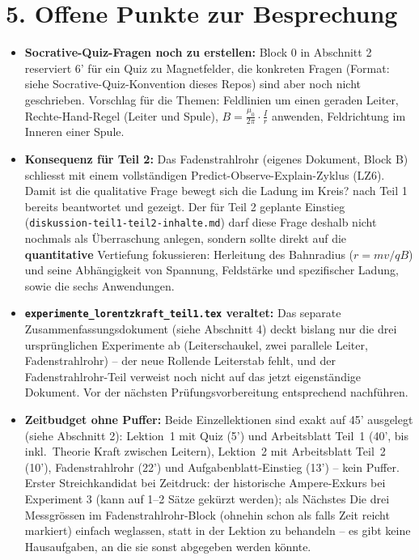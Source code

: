 \documentclass[11pt,a4paper]{article}
\begin{document}
\section*{5. Offene Punkte zur Besprechung}

\begin{itemize}[leftmargin=1.2cm,itemsep=0.4em]
  \item \textcolor{warnred}{\textbf{Socrative-Quiz-Fragen noch zu
  erstellen:}} Block 0 in Abschnitt 2 reserviert 6' für ein Quiz zu
  Magnetfelder, die konkreten Fragen (Format: siehe
  Socrative-Quiz-Konvention dieses Repos) sind aber noch nicht
  geschrieben. Vorschlag für die Themen: Feldlinien um einen geraden
  Leiter, Rechte-Hand-Regel (Leiter und Spule),
  $B=\frac{\mu_0}{2\pi}\cdot\frac{I}{r}$ anwenden, Feldrichtung im Inneren
  einer Spule.
  \item \textcolor{warnred}{\textbf{Konsequenz für Teil 2:}} Das
  Fadenstrahlrohr (eigenes Dokument, Block B) schliesst mit einem
  vollständigen Predict-Observe-Explain-Zyklus (LZ6). Damit ist die
  qualitative Frage \glqq bewegt sich die Ladung im Kreis?\grqq{} nach
  Teil 1 bereits beantwortet und gezeigt. Der für Teil 2 geplante Einstieg
  (\texttt{diskussion-teil1-teil2-inhalte.md}) darf diese Frage deshalb
  nicht nochmals als Überraschung anlegen, sondern sollte direkt auf die
  \textbf{quantitative} Vertiefung fokussieren: Herleitung des Bahnradius
  ($r=mv/qB$) und seine Abhängigkeit von Spannung, Feldstärke und
  spezifischer Ladung, sowie die sechs Anwendungen.
  \item \textbf{\texttt{experimente\_lorentzkraft\_teil1.tex} veraltet:}
  Das separate Zusammenfassungsdokument (siehe Abschnitt 4) deckt
  bislang nur die drei ursprünglichen Experimente ab (Leiterschaukel,
  zwei parallele Leiter, Fadenstrahlrohr) -- der neue Rollende
  Leiterstab fehlt, und der Fadenstrahlrohr-Teil verweist noch nicht auf
  das jetzt eigenständige Dokument. Vor der nächsten Prüfungsvorbereitung
  entsprechend nachführen.
  \item \textbf{Zeitbudget ohne Puffer:} Beide Einzellektionen sind exakt
  auf 45' ausgelegt (siehe Abschnitt 2): Lektion~1 mit Quiz (5') und
  Arbeitsblatt Teil~1 (40', bis inkl.\ Theorie Kraft zwischen Leitern),
  Lektion~2 mit Arbeitsblatt Teil~2 (10'), Fadenstrahlrohr (22') und
  Aufgabenblatt-Einstieg (13') -- kein Puffer. Erster Streichkandidat bei
  Zeitdruck: der historische Ampere-Exkurs bei
  Experiment 3 (kann auf 1--2 Sätze gekürzt werden); als Nächstes \glqq Die
  drei Messgrössen\grqq{} im Fadenstrahlrohr-Block (ohnehin schon als
  \glqq falls Zeit reicht\grqq{} markiert) einfach weglassen, statt in
  der Lektion zu behandeln -- es gibt keine Hausaufgaben, an die sie
  sonst abgegeben werden könnte.
\end{itemize}
\end{document}

